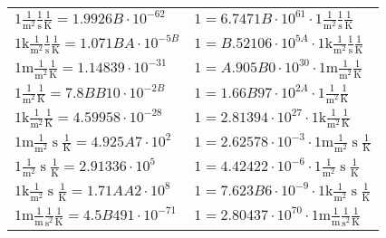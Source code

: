 \begin{center}
\begin{longtable}{l l}
{\color{black}$1 \bm{\mathrm{ }}\frac1{\operatorname{m}^2}\frac1{\operatorname{s}}{}\frac1{\operatorname{K}} = 1.9926B\cdot10^{-62} $}   & {\color{black}$ 1 = 6.7471B\cdot10^{61} \cdot 1 \bm{\mathrm{ }}\frac1{\operatorname{m}^2}\frac1{\operatorname{s}}{}\frac1{\operatorname{K}}$}  \\
{\color{gray}$1 \bm{\mathrm{ k}}\frac1{\operatorname{m}^2}\frac1{\operatorname{s}}{}\frac1{\operatorname{K}} = 1.071BA\cdot10^{-5B} $}   & {\color{gray}$ 1 = B.52106\cdot10^{5A} \cdot 1 \bm{\mathrm{ k}}\frac1{\operatorname{m}^2}\frac1{\operatorname{s}}{}\frac1{\operatorname{K}}$}  \\
{\color{gray}$1 \bm{\mathrm{ m}}\frac1{\operatorname{m}^2}{}{}\frac1{\operatorname{K}} = 1.14839\cdot10^{-31} $}   & {\color{gray}$ 1 = A.905B0\cdot10^{30} \cdot 1 \bm{\mathrm{ m}}\frac1{\operatorname{m}^2}{}{}\frac1{\operatorname{K}}$}  \\
{\color{black}$1 \bm{\mathrm{ }}\frac1{\operatorname{m}^2}{}{}\frac1{\operatorname{K}} = 7.8BB10\cdot10^{-2B} $}   & {\color{black}$ 1 = 1.66B97\cdot10^{2A} \cdot 1 \bm{\mathrm{ }}\frac1{\operatorname{m}^2}{}{}\frac1{\operatorname{K}}$}  \\
{\color{gray}$1 \bm{\mathrm{ k}}\frac1{\operatorname{m}^2}{}{}\frac1{\operatorname{K}} = 4.59958\cdot10^{-28} $}   & {\color{gray}$ 1 = 2.81394\cdot10^{27} \cdot 1 \bm{\mathrm{ k}}\frac1{\operatorname{m}^2}{}{}\frac1{\operatorname{K}}$}  \\
{\color{gray}$1 \bm{\mathrm{ m}}\frac1{\operatorname{m}^2}{\operatorname{s}}{}\frac1{\operatorname{K}} = 4.925A7\cdot10^{2} $}   & {\color{gray}$ 1 = 2.62578\cdot10^{-3} \cdot 1 \bm{\mathrm{ m}}\frac1{\operatorname{m}^2}{\operatorname{s}}{}\frac1{\operatorname{K}}$}  \\
{\color{black}$1 \bm{\mathrm{ }}\frac1{\operatorname{m}^2}{\operatorname{s}}{}\frac1{\operatorname{K}} = 2.91336\cdot10^{5} $}   & {\color{black}$ 1 = 4.42422\cdot10^{-6} \cdot 1 \bm{\mathrm{ }}\frac1{\operatorname{m}^2}{\operatorname{s}}{}\frac1{\operatorname{K}}$}  \\
{\color{gray}$1 \bm{\mathrm{ k}}\frac1{\operatorname{m}^2}{\operatorname{s}}{}\frac1{\operatorname{K}} = 1.71AA2\cdot10^{8} $}   & {\color{gray}$ 1 = 7.623B6\cdot10^{-9} \cdot 1 \bm{\mathrm{ k}}\frac1{\operatorname{m}^2}{\operatorname{s}}{}\frac1{\operatorname{K}}$}  \\
{\color{gray}$1 \bm{\mathrm{ m}}\frac1{\operatorname{m}}\frac1{\operatorname{s}^2}{}\frac1{\operatorname{K}} = 4.5B491\cdot10^{-71} $}   & {\color{gray}$ 1 = 2.80437\cdot10^{70} \cdot 1 \bm{\mathrm{ m}}\frac1{\operatorname{m}}\frac1{\operatorname{s}^2}{}\frac1{\operatorname{K}}$}  \\

\end{longtable}
\end{center}
